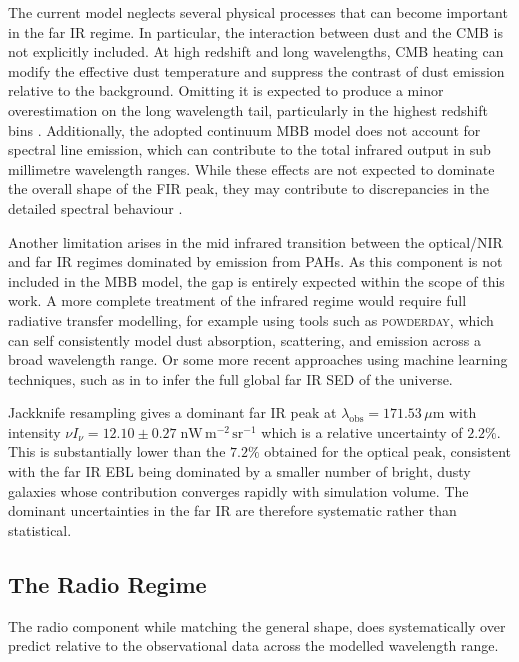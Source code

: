\documentclass[
    a4paper, %
    10pt, %
    unnumberedsections, %
]{LTJournalArticle}
\begin{document}
The current model neglects several physical processes that can become important in the far IR regime. In particular, the interaction between dust and the CMB is not explicitly included. At high redshift and long wavelengths, CMB heating can modify the effective dust temperature and suppress the contrast of dust emission relative to the background. Omitting it is expected to produce a minor overestimation on the long wavelength tail, particularly in the highest redshift bins \parencite{desertInterstellarDustEmission2022}.
Additionally, the adopted continuum MBB model does not account for spectral line emission, which can contribute to the total infrared output in sub millimetre wavelength ranges. While these effects are not expected to dominate the overall shape of the FIR peak, they may contribute to discrepancies in the detailed spectral behaviour \parencite{smailPotentialInfluenceFarinfrared2011}.

Another limitation arises in the mid infrared transition between the optical/NIR and far IR regimes dominated by emission from PAHs. As this component is not included in the MBB model, the gap is entirely expected within the scope of this work. A more complete treatment of the infrared regime would require full radiative transfer modelling, for example using tools such as \textsc{powderday}, which can self consistently model dust absorption, scattering, and emission across a broad wavelength range. Or some more recent approaches using machine learning techniques, such as in \cite{dobbelsPredictingGlobalFarinfrared2020} to infer the full global far IR SED of the universe.

Jackknife resampling gives a dominant far IR peak at $\lambda_\mathrm{obs} = 171.53\,\mu$m with intensity $\nu I_\nu = 12.10 \pm 0.27 \; \mathrm{nW\,m^{-2}\,sr^{-1}}$ which is a relative uncertainty of $2.2\%$. This is substantially lower than the $7.2\%$ obtained for the optical peak, consistent with the far IR EBL being dominated by a smaller number of bright, dusty galaxies whose contribution converges rapidly with simulation volume. The dominant uncertainties in the far IR are therefore systematic rather than statistical.

\subsection{The Radio Regime}

The radio component while matching the general shape, does systematically over predict relative to the observational data across the modelled wavelength range.
\end{document}

